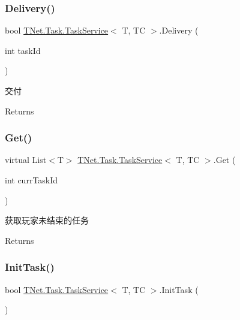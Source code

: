 \subsubsection{\texorpdfstring{Delivery()}{Delivery()}}
{\footnotesize\ttfamily bool \mbox{\hyperlink{class_t_net_1_1_task_1_1_task_service}{T\+Net.\+Task.\+Task\+Service}}$<$ T, TC $>$.Delivery (\begin{DoxyParamCaption}\item[{int}]{task\+Id }\end{DoxyParamCaption})}



交付 

\begin{DoxyReturn}{Returns}

\end{DoxyReturn}
\mbox{\label{class_t_net_1_1_task_1_1_task_service_a87bf52d031b6abdc00452653346b74d5}} 
\subsubsection{\texorpdfstring{Get()}{Get()}}
{\footnotesize\ttfamily virtual List$<$T$>$ \mbox{\hyperlink{class_t_net_1_1_task_1_1_task_service}{T\+Net.\+Task.\+Task\+Service}}$<$ T, TC $>$.Get (\begin{DoxyParamCaption}\item[{int}]{curr\+Task\+Id }\end{DoxyParamCaption})\hspace{0.3cm}{\ttfamily [virtual]}}



获取玩家未结束的任务 

\begin{DoxyReturn}{Returns}

\end{DoxyReturn}
\mbox{\label{class_t_net_1_1_task_1_1_task_service_a32dad4237cfce9ec978060a85f8f557e}} 
\subsubsection{\texorpdfstring{Init\+Task()}{InitTask()}}
{\footnotesize\ttfamily bool \mbox{\hyperlink{class_t_net_1_1_task_1_1_task_service}{T\+Net.\+Task.\+Task\+Service}}$<$ T, TC $>$.Init\+Task (\begin{DoxyParamCaption}{ }\end{DoxyParamCaption})\hspace{0.3cm}{\ttfamily [protected]}}



